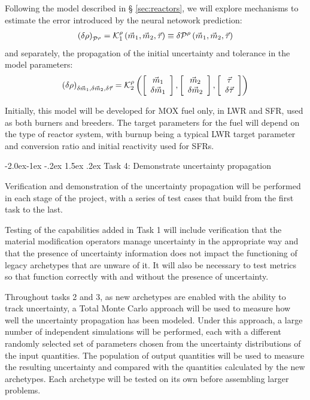 \documentclass[dvips,12pt]{article}
\makeatletter
\newcommand{\unc}[1]
{ \delta #1 }
\newcommand{\uncvector}[1]
{ \left[ \begin{array}{c} #1 \\ \delta #1 \end{array} \right] }
\renewcommand\subsection{\@startsection{subsection}{2}{\z@}%
                                     {-2.0ex\@plus -1ex \@minus -.2ex}%
                                     {1.5ex \@plus .2ex}%
                                     {\normalfont\bfseries}}%
\makeatother
\begin{document}
Following the model described in \S
\ref{sec:reactors}, we will explore mechanisms to
estimate the error introduced by the neural
netowork prediction:
\begin{align}
  \left(\unc{\rho}\right)_{\cal P^\rho} = {\cal K}_1^{\rho}\left( \vec{m}_{1},\vec{m}_{2}, \vec{\tau} \right) \equiv \delta {\cal P}^\rho\left( \vec{m}_{1},\vec{m}_{2}, \vec{\tau} \right)
\end{align}
and separately, the propagation of the initial uncertainty and tolerance in the model parameters:
\begin{align}
  \left(\unc{\rho}\right)_{\unc{\vec{m}_{1}},\unc{\vec{m}_{2}},\unc{\vec{\tau}}} = {\cal K}^{\rho}_2\left( \uncvector{\vec{m}_{1}},\uncvector{\vec{m}_{2}}, \uncvector{\vec{\tau}} \right)
\end{align}

Initially, this model will be developed for MOX
fuel only, in LWR and SFR, used as both burners
and breeders.  The target parameters for the fuel
will depend on the type of reactor system, with
burnup being a typical LWR target parameter and
conversion ratio and initial reactivity used for
SFRs.

\subsection{Task 4: Demonstrate uncertainty propagation}

Verification and demonstration of the uncertainty
propagation will be performed in each stage of the
project, with a series of test cases that build
from the first task to the last.

Testing of the capabilities added in Task 1 will
include verification that the material
modification operators manage uncertainty in the
appropriate way and that the presence of
uncertainty information does not impact the
functioning of legacy archetypes that are unware
of it.  It will also be necessary to test metrics
so that function correctly with and without the
presence of uncertainty.

Throughout tasks 2 and 3, as new archetypes are
enabled with the ability to track uncertainty, a
Total Monte Carlo approach will be used to measure
how well the uncertainty propagation has been
modeled.  Under this approach, a large number of
independent simulations will be performed, each
with a different randomly selected set of
parameters chosen from the uncertainty
distributions of the input quantities.  The
population of output quantities will be used to
measure the resulting uncertainty and compared
with the quantities calculated by the new
archetypes.  Each archetype will be tested on its
own before assembling larger problems.
\end{document}
